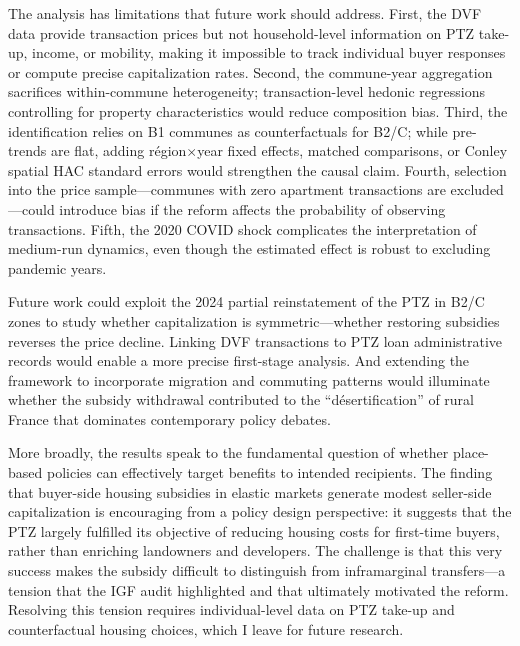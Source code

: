 \documentclass[12pt]{article}
\begin{document}
The analysis has limitations that future work should address. First, the DVF data provide transaction prices but not household-level information on PTZ take-up, income, or mobility, making it impossible to track individual buyer responses or compute precise capitalization rates. Second, the commune-year aggregation sacrifices within-commune heterogeneity; transaction-level hedonic regressions controlling for property characteristics would reduce composition bias. Third, the identification relies on B1 communes as counterfactuals for B2/C; while pre-trends are flat, adding r\'{e}gion$\times$year fixed effects, matched comparisons, or Conley spatial HAC standard errors would strengthen the causal claim. Fourth, selection into the price sample---communes with zero apartment transactions are excluded---could introduce bias if the reform affects the probability of observing transactions. Fifth, the 2020 COVID shock complicates the interpretation of medium-run dynamics, even though the estimated effect is robust to excluding pandemic years.

Future work could exploit the 2024 partial reinstatement of the PTZ in B2/C zones to study whether capitalization is symmetric---whether restoring subsidies reverses the price decline. Linking DVF transactions to PTZ loan administrative records would enable a more precise first-stage analysis. And extending the framework to incorporate migration and commuting patterns would illuminate whether the subsidy withdrawal contributed to the ``d\'{e}sertification'' of rural France that dominates contemporary policy debates.

More broadly, the results speak to the fundamental question of whether place-based policies can effectively target benefits to intended recipients. The finding that buyer-side housing subsidies in elastic markets generate modest seller-side capitalization is encouraging from a policy design perspective: it suggests that the PTZ largely fulfilled its objective of reducing housing costs for first-time buyers, rather than enriching landowners and developers. The challenge is that this very success makes the subsidy difficult to distinguish from inframarginal transfers---a tension that the IGF audit \citep{igf2019} highlighted and that ultimately motivated the reform. Resolving this tension requires individual-level data on PTZ take-up and counterfactual housing choices, which I leave for future research.
\end{document}
